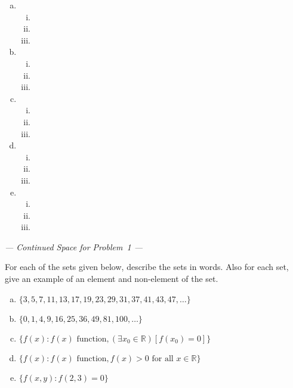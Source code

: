 \documentclass[11pt,letterpaper]{article}
\begin{document}
\sol 
\begin{enumerate}[(a)]
\item \phantom{.}\par
	\begin{enumerate}[(i)]
	\item 
	\item 
	\item 
	\end{enumerate}

\item \phantom{.}\par
	\begin{enumerate}[(i)]
	\item 
	\item 
	\item 
	\end{enumerate}

\item \phantom{.}\par
	\begin{enumerate}[(i)]
	\item 
	\item 
	\item 
	\end{enumerate}

\item \phantom{.}\par
	\begin{enumerate}[(i)]
	\item 
	\item 
	\item 
	\end{enumerate}

\item \phantom{.}\par
	\begin{enumerate}[(i)]
	\item 
	\item 
	\item 
	\end{enumerate}
\end{enumerate}



\newpage 
\begin{center} {\itshape --- Continued Space for Problem~1 ---} \end{center}
\newpage


 For each of the sets given below, describe the sets in words. Also for each set, give an example of an element and non-element of the set.
	\begin{enumerate}[(a)]
	\item $\{ 3, 5, 7, 11, 13, 17, 19, 23, 29, 31, 37, 41, 43, 47, \ldots \}$
	\item $\{ 0, 1, 4, 9, 16, 25, 36, 49, 81, 100, \ldots \}$
	\item $\{ f(x) \colon f(x) \text{ function}, ( \exists x_0 \in \mathbb{R} ) [f(x_0)= 0] \}$
	\item $\{ f(x) \colon f(x) \text{ function}, f(x) > 0 \text{ for all } x \in \mathbb{R} \}$
	\item $\{ f(x, y) \colon f(2, 3)= 0 \}$
	\end{enumerate} \pspace
\end{document}
